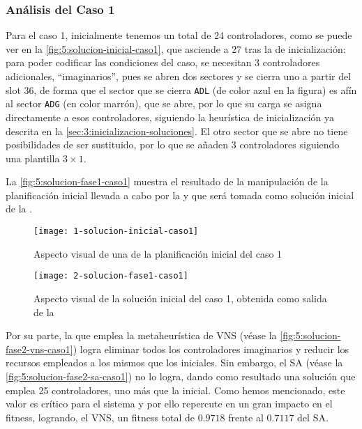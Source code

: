 \subsubsection{Análisis del Caso 1}

Para el caso 1, inicialmente tenemos un total de 24 controladores, como se puede ver en la \autoref{fig:5:solucion-inicial-caso1}, que asciende a 27 tras la \faseuno{} de inicialización: para poder codificar las condiciones del caso, se necesitan 3 controladores adicionales, ``imaginarios'', pues se abren dos sectores y se cierra uno a partir del slot 36, de forma que el sector que se cierra \texttt{ADL} (de color azul en la figura) es afín al sector \texttt{ADG} (en color marrón), que se abre, por lo que su carga se asigna directamente a esos controladores, siguiendo la heurística de inicialización ya descrita en la \autoref{sec:3:inicializacion-soluciones}. El otro sector que se abre no tiene posibilidades de ser sustituido, por lo que se añaden 3 controladores siguiendo una plantilla $3\times1$.

La \autoref{fig:5:solucion-fase1-caso1} muestra el resultado de la manipulación de la planificación inicial llevada a cabo por la \faseuno{} y que será tomada como solución inicial de la \fasedos{}.

\begin{figure}
	\centering
	\texttt{[image: 1-solucion-inicial-caso1]}
	\caption{Aspecto visual de una de la planificación inicial del caso 1}
	\label{fig:5:solucion-inicial-caso1}
\end{figure}

\begin{figure}
	\centering
	\texttt{[image: 2-solucion-fase1-caso1]}
	\caption{Aspecto visual de la solución inicial del caso 1, obtenida como salida de la \faseuno{}}
	\label{fig:5:solucion-fase1-caso1}
\end{figure}

Por su parte, la \fasedos{} que emplea la metaheurística de VNS (véase la \autoref{fig:5:solucion-fase2-vns-caso1}) logra eliminar todos los controladores imaginarios y reducir los recursos empleados a los mismos que los iniciales. Sin embargo, el SA (véase la \autoref{fig:5:solucion-fase2-sa-caso1}) no lo logra, dando como resultado una solución que emplea 25 controladores, uno más que la inicial. Como hemos mencionado, este valor es crítico para el sistema y por ello repercute en un gran impacto en el fitness, logrando, el VNS, un fitness total de $0.9718$ frente al $0.7117$ del SA. 

